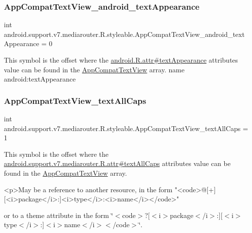\subsubsection{\texorpdfstring{App\+Compat\+Text\+View\+\_\+android\+\_\+text\+Appearance}{AppCompatTextView\_android\_textAppearance}}
{\footnotesize\ttfamily int android.\+support.\+v7.\+mediarouter.\+R.\+styleable.\+App\+Compat\+Text\+View\+\_\+android\+\_\+text\+Appearance = 0\hspace{0.3cm}{\ttfamily [static]}}

This symbol is the offset where the \hyperlink{}{android.\+R.\+attr\#text\+Appearance} attribute\textquotesingle{}s value can be found in the \hyperlink{classandroid_1_1support_1_1v7_1_1mediarouter_1_1R_1_1styleable_a0c5a7d15ad417c65366ead3c4e4a2b25}{App\+Compat\+Text\+View} array.  name android\+:text\+Appearance \mbox{\label{classandroid_1_1support_1_1v7_1_1mediarouter_1_1R_1_1styleable_a158abba218ddea699db0d0ec5c5595f1}} 
\subsubsection{\texorpdfstring{App\+Compat\+Text\+View\+\_\+text\+All\+Caps}{AppCompatTextView\_textAllCaps}}
{\footnotesize\ttfamily int android.\+support.\+v7.\+mediarouter.\+R.\+styleable.\+App\+Compat\+Text\+View\+\_\+text\+All\+Caps = 1\hspace{0.3cm}{\ttfamily [static]}}

This symbol is the offset where the \hyperlink{classandroid_1_1support_1_1v7_1_1mediarouter_1_1R_1_1attr_a3512dcd83093488c2c75e79b3685e5a2}{android.\+support.\+v7.\+mediarouter.\+R.\+attr\#text\+All\+Caps} attribute\textquotesingle{}s value can be found in the \hyperlink{classandroid_1_1support_1_1v7_1_1mediarouter_1_1R_1_1styleable_a0c5a7d15ad417c65366ead3c4e4a2b25}{App\+Compat\+Text\+View} array.

\begin{DoxyVerb}      <p>May be a reference to another resource, in the form "<code>@[+][<i>package</i>:]<i>type</i>:<i>name</i></code>"
\end{DoxyVerb}
 or to a theme attribute in the form \char`\"{}$<$code$>$?\mbox{[}$<$i$>$package$<$/i$>$\+:\mbox{]}\mbox{[}$<$i$>$type$<$/i$>$\+:\mbox{]}$<$i$>$name$<$/i$>$$<$/code$>$\char`\"{}. 

